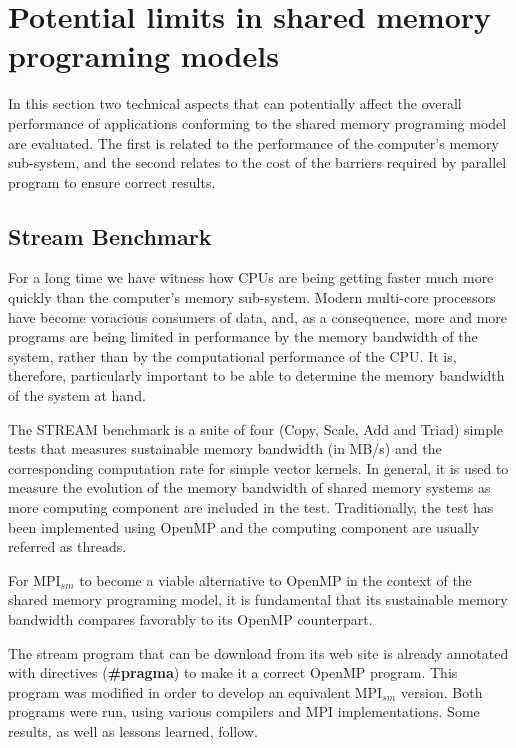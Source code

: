 \section{Potential limits in shared memory programing models}

In this section two technical aspects that can potentially affect the overall performance of applications conforming to the shared memory programing model are evaluated. The first is related to the performance of the computer's memory sub-system, and the second relates to the cost of the barriers required by parallel program to ensure correct results.


\subsection*{Stream Benchmark}

For a long time we have witness how CPUs are being getting faster much more quickly than the computer's memory sub-system. Modern multi-core processors have become voracious consumers of data, and, as a consequence, more and more programs are being limited in performance by the memory bandwidth of the system, rather than by the computational performance of the CPU\cite{McCalpin2007}. It is, therefore, particularly important to be able to determine the memory bandwidth of the system at hand. 

\medskip


The STREAM benchmark\cite{McCalpin2007} is a suite of four (Copy, Scale, Add and Triad) simple tests that measures sustainable memory bandwidth (in MB/s) and the corresponding computation rate for simple vector kernels. In general, it is used to measure the evolution of the memory bandwidth of shared memory systems as more computing component are included in the test. Traditionally, the test has been implemented using OpenMP and the computing component are usually referred as threads.

\medskip

For MPI$_{sm}$ to become a viable alternative to OpenMP in the context of the shared memory programing model, it is fundamental that its sustainable memory bandwidth compares favorably to its OpenMP counterpart.

\medskip

The stream program that can be download from its web site \cite{McCalpin2007} is already annotated with directives (\textbf{\#pragma}) to make it a correct OpenMP program. This program was modified in order to develop an equivalent  MPI$_{sm}$ version. Both programs were run, using various compilers and MPI implementations. Some results, as well as lessons learned, follow.

